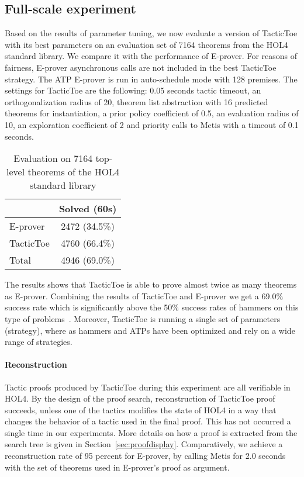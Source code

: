 \documentclass[runningheads,a4paper,draft]{svjour3}
\def\holfour{\textsf{HOL4}\xspace}
\def\eprover{\textsf{E-prover}\xspace}
\def\metis{\textsf{Metis}\xspace}
\def\tactictoe{\textsf{TacticToe}\xspace}
\newcommand{\ra}[1]{\renewcommand{\arraystretch}{#1}}
\begin{document}
\subsection{Full-scale experiment}\label{sec:full_exp}

Based on the results of parameter tuning, we now evaluate a version of
\tactictoe with its best parameters on an evaluation set of 7164 theorems from
the \holfour standard library. We compare it with the performance of \eprover.
For reasons of fairness, \eprover asynchronous calls are not included in the
best \tactictoe strategy. The ATP \eprover is run in auto-schedule mode with
128 premises. The settings for \tactictoe are the following:
0.05 seconds tactic timeout, an orthogonalization radius of 20, theorem list
abstraction with 16 predicted theorems for instantiation, a prior policy
coefficient of 0.5, an evaluation radius of 10, an exploration coefficient of 2
and priority calls to \metis with a timeout of 0.1 seconds.

\begin{table}[h!]
\centering\ra{1.3}
\small
\begin{tabular}{lc}
\toprule
  & Solved (60s) \\
\midrule
   \eprover   & 2472 (34.5\%)\\
   \tactictoe & 4760 (66.4\%)\\
\midrule
   Total  & 4946 (69.0\%)\\
\bottomrule
\end{tabular}
\caption{Evaluation on 7164 top-level theorems of the \holfour standard library
\label{tab:_param}}
\end{table}

The results shows that \tactictoe is able to prove almost twice as many
theorems as \eprover. Combining the results of \tactictoe and \eprover we get a
69.0\% success rate which is significantly above the 50\% success rates
of hammers on this type of problems~\cite{tgck-cpp15}. Moreover, \tactictoe is
running a single set of parameters (strategy), where as hammers and ATPs have
been optimized and rely on a wide range of strategies.


\paragraph{Reconstruction}
Tactic proofs produced by \tactictoe during this experiment are all verifiable
in \holfour. By the design of the proof search, reconstruction of \tactictoe
proof succeeds, unless one of the tactics modifies the state of \holfour in a
way that changes the behavior of a tactic used in the final proof. This has not
occurred a single time in our experiments.
More details on how a proof is extracted from the search tree is given in
Section~\ref{sec:proofdisplay}.
Comparatively, we achieve a reconstruction rate of 95 percent for \eprover,
by calling \metis for 2.0 seconds with the set of theorems used
in \eprover's proof as argument.
\end{document}

